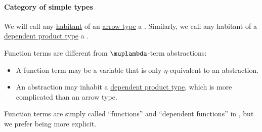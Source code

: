 \paragraph{Category of simple types}

\begin{definition}\label{def:type_theory_function_term}\mimprovised
  We will call any \hyperref[def:type_habitation]{habitant} of an \hyperref[def:arrow_type]{arrow type} a . Similarly, we call any habitant of a \hyperref[def:dependent_product]{dependent product type} a .
\end{definition}
\begin{comments}
  \item Function terms are different from \( \muplambda \)-term abstractions:
  \begin{itemize}
    \item A function term may be a variable that is only \( \eta \)-equivalent to an abstraction.
    \item An abstraction may inhabit a \hyperref[def:dependent_product]{dependent product type}, which is more complicated than an arrow type.
  \end{itemize}

  \item Function terms are simply called \enquote{functions} and \enquote{dependent functions} in \cite[21; 25]{UnivalentFoundationsProgram2013HoTT}, but we prefer being more explicit.
\end{comments}

